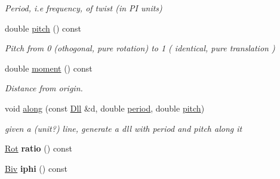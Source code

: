 \begin{DoxyCompactItemize}
\begin{DoxyCompactList}\small\item\em Period, i.\-e frequency, of twist (in P\-I units) \end{DoxyCompactList}\item 
\hypertarget{classvsr_1_1_twist_ad77f024ccd01884dcb9eb3a045a85426}{double \hyperlink{classvsr_1_1_twist_ad77f024ccd01884dcb9eb3a045a85426}{pitch} () const }\label{classvsr_1_1_twist_ad77f024ccd01884dcb9eb3a045a85426}

\begin{DoxyCompactList}\small\item\em Pitch from 0 (othogonal, pure rotation) to 1 ( identical, pure translation ) \end{DoxyCompactList}\item 
\hypertarget{classvsr_1_1_twist_a9134cc4c7f736d737c46d2a7ee87a6fd}{double \hyperlink{classvsr_1_1_twist_a9134cc4c7f736d737c46d2a7ee87a6fd}{moment} () const }\label{classvsr_1_1_twist_a9134cc4c7f736d737c46d2a7ee87a6fd}

\begin{DoxyCompactList}\small\item\em Distance from origin. \end{DoxyCompactList}\item 
\hypertarget{classvsr_1_1_twist_aba59be836ad65578bd2000ea79a9fe20}{void \hyperlink{classvsr_1_1_twist_aba59be836ad65578bd2000ea79a9fe20}{along} (const \hyperlink{namespacevsr_a6c6892b7aec25cfb16492501e2e35b11}{Dll} \&d, double \hyperlink{classvsr_1_1_twist_a5b1e72c1d494d5b77894aa63a779e3b4}{period}, double \hyperlink{classvsr_1_1_twist_ad77f024ccd01884dcb9eb3a045a85426}{pitch})}\label{classvsr_1_1_twist_aba59be836ad65578bd2000ea79a9fe20}

\begin{DoxyCompactList}\small\item\em given a (unit?) line, generate a dll with period and pitch along it \end{DoxyCompactList}\item 
\hypertarget{classvsr_1_1_twist_a2a66b764ae775c3bbdfb983d9673bd73}{\hyperlink{namespacevsr_aa1af5d33b552dd31499209a8f68548e8}{Rot} {\bfseries ratio} () const }\label{classvsr_1_1_twist_a2a66b764ae775c3bbdfb983d9673bd73}

\item 
\hypertarget{classvsr_1_1_twist_a6680a5fbda746dea8c0363396379d979}{\hyperlink{namespacevsr_ab2f5aee828c6c805b8a86a5b077d192c}{Biv} {\bfseries iphi} () const }\label{classvsr_1_1_twist_a6680a5fbda746dea8c0363396379d979}


\end{DoxyCompactItemize}
